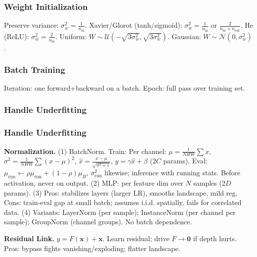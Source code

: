 \subsubsection*{Weight Initialization}
Preserve variance: $\sigma_w^2=\frac{1}{n_{\text{in}}}$.
Xavier/Glorot (tanh/sigmoid): $\sigma_w^2=\frac{1}{n_{\text{in}}}$ or $\frac{2}{n_{\text{in}}+n_{\text{out}}}$.
He (ReLU): $\sigma_w^2=\frac{2}{n_{\text{in}}}$.
Uniform: $W\sim\mathcal{U}(-\sqrt{3\sigma_w^2},\sqrt{3\sigma_w^2})$.
Gaussian: $W\sim\mathcal{N}(0,\sigma_w^2)$.

\subsubsection*{Batch Training}
Iteration: one forward+backward on a batch. Epoch: full pass over training set.

\subsubsection*{Handle Underfitting}
\subsubsection*{Handle Underfitting}
\textbf{Normalization.}
(1) BatchNorm.
Train: Per channel: $\mu=\frac{1}{NHW}\sum x$, $\sigma^2=\frac{1}{NHW}\sum(x-\mu)^2$, $\hat x=\frac{x-\mu}{\sqrt{\sigma^2+\epsilon}}$, $y=\gamma\hat x+\beta$ ($2C$ params).
Eval: $\mu_{\text{run}}\leftarrow\rho\mu_{\text{run}}+(1-\rho)\mu_B$, $\sigma^2_{\text{run}}$ likewise; inference with running stats.
Before activation, never on output.
(2) MLP: per feature dim over $N$ samples ($2D$ params).
(3) Pros: stabilizes layers (larger LR), smooths landscape, mild reg. Cons: train-eval gap at small batch; assumes i.i.d. spatially, fails for correlated data.
(4) Variants: LayerNorm (per sample); InstanceNorm (per channel per sample); GroupNorm (channel groups). No batch dependence.


\textbf{Residual Link.}
$y=F(\mathbf{x})+\mathbf{x}$. Learn residual; drive $F\to\mathbf{0}$ if depth hurts. Pros: bypass fights vanishing/exploding; flatter landscape.

